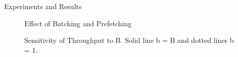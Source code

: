 \documentclass[final]{beamer}
\newlength{\twocolwid}
\begin{document}
\begin{frame}
\begin{columns}[t]
\begin{column}{\twocolwid}

\begin{columns}[t,totalwidth=\twocolwid] %
\begin{column}{\twocolwid} %
\begin{exampleblock}{Experiments and Results}
\begin{multicols}{3}

\begin{figure}
\caption{Effect of Batching and Prefetching}
\end{figure}

\begin{figure}
\caption{Sensitivity of Throughput to B. Solid line b = B and dotted lines b = 1.}
\end{figure}


\end{multicols}
\end{exampleblock}
\end{column}
\end{columns}
\end{column}
\end{columns}
\end{frame}
\end{document}
